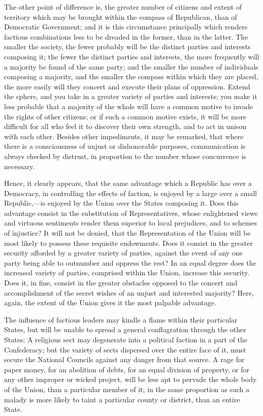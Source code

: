 The other point of difference is, the greater number of citizens and
extent of territory which may be brought within the compass of
Republican, than of Democratic Government; and it is this circumstance
principally which renders factious combinations less to be dreaded
 in the former, than in the latter. The smaller the society,
the fewer probably will be the distinct parties and interests
composing it; the fewer the distinct parties and interests, the more
frequently will a majority be found of the same party; and the smaller
the number of individuals composing a majority, and the smaller the
compass within which they are placed, the more easily will they
concert and execute their plans of oppression. Extend the sphere, and
you take in a greater variety of parties and interests; you make it
less probable that a majority of the whole will have a common motive
to invade the rights of other citizens; or if such a common motive
exists, it will be more difficult for all who feel it to discover
their own strength, and to act in unison with each other. Besides
other impediments, it may be remarked, that where there is a
consciousness of unjust or dishonorable purposes, communication is
always checked by distrust, in proportion to the number whose
concurrence is necessary.

Hence, it clearly appears, that the same advantage which a Republic
has over a Democracy, in controlling the effects of faction, is
enjoyed by a large over a small Republic,---is enjoyed by the Union
over the States composing it. Does this advantage consist in the
substitution of Representatives, whose enlightened views and virtuous
sentiments render them superior to local prejudices, and to schemes of
injustice? It will not be denied, that the Representation of the Union
will be most likely to possess these requisite endowments. Does it
consist in the greater security afforded by a greater variety of
parties, against the event of any one party being able to outnumber
and oppress the rest? In an equal degree does the increased variety of
parties, comprised within the Union, increase this security. Does it,
in fine, consist in the greater obstacles opposed to the concert and
accomplishment of the secret wishes  of an unjust and
interested majority? Here, again, the extent of the Union gives it the
most palpable advantage.


The influence of factious leaders may kindle a flame within their
particular States, but will be unable to spread a general
conflagration through the other States: A religious sect may
degenerate into a political faction in a part of the Confederacy; but
the variety of sects dispersed over the entire face of it, must secure
the National Councils against any danger from that source. A rage for
paper money, for an abolition of debts, for an equal division of
property, or for any other improper or wicked project, will be less
apt to pervade the whole body of the Union, than a particular member
of it; in the same proportion as such a malady is more likely to taint
a particular county or district, than an entire State.


